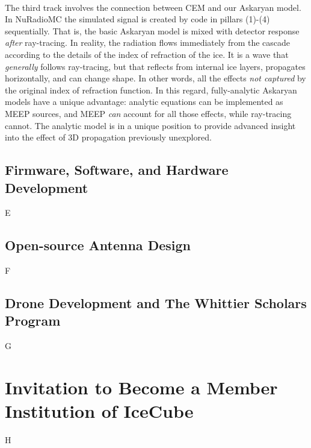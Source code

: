 \documentclass[../../../main.tex]{subfiles}
\begin{document}
\\
\vspace{0.25cm}
The third track involves the connection between CEM and our Askaryan model.  In NuRadioMC the simulated signal is created by code in pillars (1)-(4) sequentially.  That is, the basic Askaryan model is mixed with detector response \textit{after} ray-tracing.  In reality, the radiation flows immediately from the cascade according to the details of the index of refraction of the ice.  It is a wave that \textit{generally} follows ray-tracing, but that reflects from internal ice layers, propagates horizontally, and can change shape.  In other words, all the effects \textit{not captured} by the original index of refraction function.  In this regard, fully-analytic Askaryan models have a unique advantage: analytic equations can be implemented as MEEP sources, and MEEP \textit{can} account for all those effects, while ray-tracing cannot.  The analytic model is in a unique position to provide advanced insight into the effect of 3D propagation previously unexplored.

\subsection{Firmware, Software, and Hardware Development}
E
\subsection{Open-source Antenna Design}
F
\subsection{Drone Development and The Whittier Scholars Program}
G
\section{Invitation to Become a Member Institution of IceCube}
H
\end{document}
